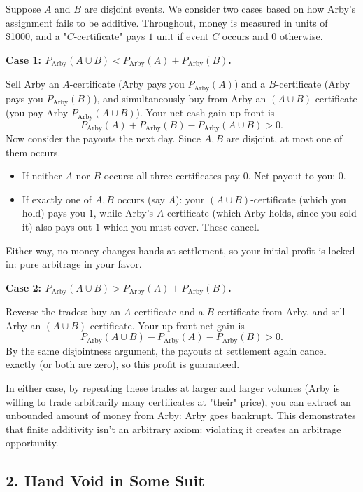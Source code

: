 \documentclass{article}
\begin{document}
Suppose $A$ and $B$ are disjoint events. We consider two cases based on how Arby's assignment fails to be additive. Throughout, money is measured in units of \$1000, and a "$C$-certificate" pays $1$ unit if event $C$ occurs and $0$ otherwise.

\textbf{Case 1: $P_{\text{Arby}}(A\cup B) < P_{\text{Arby}}(A) + P_{\text{Arby}}(B)$.}

Sell Arby an $A$-certificate (Arby pays you $P_{\text{Arby}}(A)$) and a $B$-certificate (Arby pays you $P_{\text{Arby}}(B)$), and simultaneously buy from Arby an $(A\cup B)$-certificate (you pay Arby $P_{\text{Arby}}(A\cup B)$). Your net cash gain up front is
$$P_{\text{Arby}}(A)+P_{\text{Arby}}(B) - P_{\text{Arby}}(A\cup B) > 0.$$
Now consider the payouts the next day. Since $A,B$ are disjoint, at most one of them occurs.
\begin{itemize}
\item If neither $A$ nor $B$ occurs: all three certificates pay $0$. Net payout to you: $0$.
\item If exactly one of $A,B$ occurs (say $A$): your $(A\cup B)$-certificate (which you hold) pays you $1$, while Arby's $A$-certificate (which Arby holds, since you sold it) also pays out $1$ which you must cover. These cancel.
\end{itemize}
Either way, no money changes hands at settlement, so your initial profit is locked in: pure arbitrage in your favor.

\medskip
\textbf{Case 2: $P_{\text{Arby}}(A\cup B) > P_{\text{Arby}}(A) + P_{\text{Arby}}(B)$.}

Reverse the trades: buy an $A$-certificate and a $B$-certificate from Arby, and sell Arby an $(A\cup B)$-certificate. Your up-front net gain is
$$P_{\text{Arby}}(A\cup B) - P_{\text{Arby}}(A) - P_{\text{Arby}}(B) > 0.$$
By the same disjointness argument, the payouts at settlement again cancel exactly (or both are zero), so this profit is guaranteed.

\medskip
In either case, by repeating these trades at larger and larger volumes (Arby is willing to trade arbitrarily many certificates at "their" price), you can extract an unbounded amount of money from Arby: Arby goes bankrupt. This demonstrates that finite additivity isn't an arbitrary axiom: violating it creates an arbitrage opportunity.

\subsection*{2. Hand Void in Some Suit}
\end{document}
